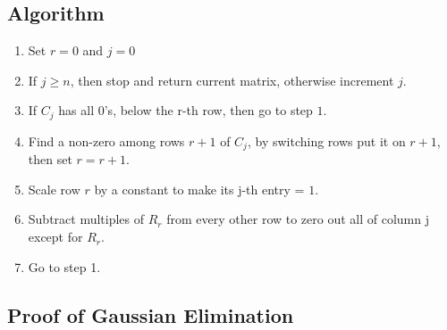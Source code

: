 \documentclass{article}
\newtheorem{one minute paper}[theorem]{One Minute Paper}
\begin{document}
\subsection*{Algorithm}
\begin{enumerate}
    \item Set $r = 0$ and $j = 0$
    \item If $j \geq n$, then stop and return current matrix, otherwise increment $j$.
    \item If $C_j$ has all $0$'s, below the r-th row, then go to step $1$.
    \item Find a non-zero among rows $r+1$ of $C_j$, by switching rows put it on $r+1$, then set $r = r + 1$. 
    \item Scale row $r$ by a constant to make its j-th entry = $1$. 
    \item Subtract multiples of $R_r$ from every other row to zero out all of column j except for $R_r$.
    \item Go to step 1.
\end{enumerate}

\subsection*{Proof of Gaussian Elimination}
\end{document}
